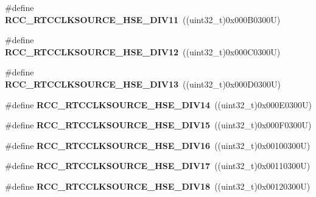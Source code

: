 \begin{DoxyCompactItemize}
\#define {\bfseries R\+C\+C\+\_\+\+R\+T\+C\+C\+L\+K\+S\+O\+U\+R\+C\+E\+\_\+\+H\+S\+E\+\_\+\+D\+I\+V11}~((uint32\+\_\+t)0x000\+B0300\+U)
\item 
\mbox{\label{group___r_c_c___r_t_c___clock___source_ga06837111cb6294d55f681347514a233d}} 
\#define {\bfseries R\+C\+C\+\_\+\+R\+T\+C\+C\+L\+K\+S\+O\+U\+R\+C\+E\+\_\+\+H\+S\+E\+\_\+\+D\+I\+V12}~((uint32\+\_\+t)0x000\+C0300\+U)
\item 
\mbox{\label{group___r_c_c___r_t_c___clock___source_ga2c447a815f2e116f88b604eeaa7aab0b}} 
\#define {\bfseries R\+C\+C\+\_\+\+R\+T\+C\+C\+L\+K\+S\+O\+U\+R\+C\+E\+\_\+\+H\+S\+E\+\_\+\+D\+I\+V13}~((uint32\+\_\+t)0x000\+D0300\+U)
\item 
\mbox{\label{group___r_c_c___r_t_c___clock___source_ga5dceac607cd03d87002cdb78b3234941}} 
\#define {\bfseries R\+C\+C\+\_\+\+R\+T\+C\+C\+L\+K\+S\+O\+U\+R\+C\+E\+\_\+\+H\+S\+E\+\_\+\+D\+I\+V14}~((uint32\+\_\+t)0x000\+E0300\+U)
\item 
\mbox{\label{group___r_c_c___r_t_c___clock___source_ga9594f8553a259c18fb354e903c01b041}} 
\#define {\bfseries R\+C\+C\+\_\+\+R\+T\+C\+C\+L\+K\+S\+O\+U\+R\+C\+E\+\_\+\+H\+S\+E\+\_\+\+D\+I\+V15}~((uint32\+\_\+t)0x000\+F0300\+U)
\item 
\mbox{\label{group___r_c_c___r_t_c___clock___source_ga48e1ffd844b9e9192c5d7dbeed20765f}} 
\#define {\bfseries R\+C\+C\+\_\+\+R\+T\+C\+C\+L\+K\+S\+O\+U\+R\+C\+E\+\_\+\+H\+S\+E\+\_\+\+D\+I\+V16}~((uint32\+\_\+t)0x00100300\+U)
\item 
\mbox{\label{group___r_c_c___r_t_c___clock___source_ga62707003a86f4c4747ae89af2e561e0c}} 
\#define {\bfseries R\+C\+C\+\_\+\+R\+T\+C\+C\+L\+K\+S\+O\+U\+R\+C\+E\+\_\+\+H\+S\+E\+\_\+\+D\+I\+V17}~((uint32\+\_\+t)0x00110300\+U)
\item 
\mbox{\label{group___r_c_c___r_t_c___clock___source_ga264428cbc7bc54bfcd794a4027ac1f5e}} 
\#define {\bfseries R\+C\+C\+\_\+\+R\+T\+C\+C\+L\+K\+S\+O\+U\+R\+C\+E\+\_\+\+H\+S\+E\+\_\+\+D\+I\+V18}~((uint32\+\_\+t)0x00120300\+U)

\end{DoxyCompactItemize}
